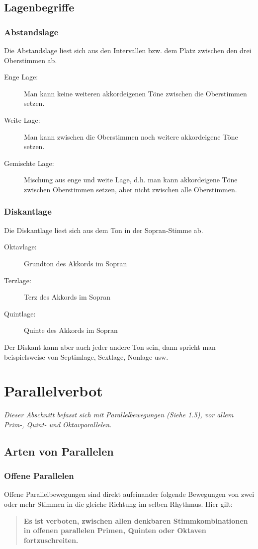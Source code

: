 \documentclass[a4paper]{article}
\begin{document}
	\subsection{Lagenbegriffe}
	\subsubsection{Abstandslage}
	Die Abstandslage liest sich aus den Intervallen bzw. dem Platz zwischen den drei Oberstimmen ab.
	\begin{description}
		\item [Enge Lage:] Man kann keine weiteren akkordeigenen Töne zwischen die Oberstimmen setzen.
		\item [Weite Lage:] Man kann zwischen die Oberstimmen noch weitere akkordeigene Töne setzen.
		\item [Gemischte Lage:] Mischung aus enge und weite Lage, d.h. man kann akkordeigene Töne zwischen Oberstimmen setzen, aber nicht zwischen alle Oberstimmen.
	\end{description}

	\subsubsection{Diskantlage}
	Die Diskantlage liest sich aus dem Ton in der Sopran-Stimme ab.
	\begin{description}
		\item[Oktavlage:] Grundton des Akkords im Sopran
		\item[Terzlage:] Terz des Akkords im Sopran
		\item[Quintlage:] Quinte des Akkords im Sopran
	\end{description}
	Der Diskant kann aber auch jeder andere Ton sein, dann spricht man beispielsweise von Septimlage, Sextlage, Nonlage usw.
	
	\section{Parallelverbot}
	\textit{Dieser Abschnitt befasst sich mit Parallelbewegungen (Siehe 1.5), vor allem Prim-, Quint- und Oktavparallelen.}
	\subsection{Arten von Parallelen}
	\subsubsection{Offene Parallelen}
	Offene Parallelbewegungen sind direkt aufeinander folgende Bewegungen von zwei oder mehr Stimmen in die gleiche Richtung im selben Rhythmus. Hier gilt:
	\begin{quote}
		\textbf{Es ist verboten, zwischen allen denkbaren Stimmkombinationen in offenen parallelen Primen, Quinten oder Oktaven fortzuschreiten.}
	\end{quote}
\end{document}
